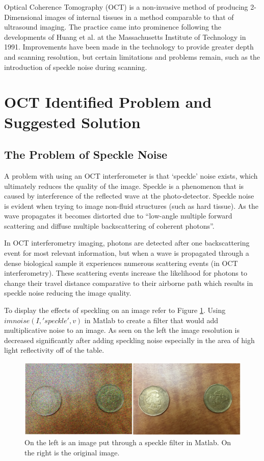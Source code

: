 \documentclass[%
reprint,
showpacs,preprintnumbers,
bibnotes,
amsmath,amssymb,
aps,
pra,
]{revtex4-1}
\begin{document}
		Optical Coherence Tomography (OCT) is a non-invasive method of producing 2-Dimensional images of internal tissues in a method comparable to that of ultrasound imaging.\cite{Huang91}\cite{sander_optical_2011} The practice came into prominence following the developments of Huang et al. at the Massachusetts Institute of Technology in 1991. \cite{Huang91} Improvements have been made in the technology to provide greater depth and scanning resolution, but certain limitations and problems remain, such as the introduction of speckle noise during scanning.




	\section{\label{sec:level1}OCT Identified Problem and Suggested Solution}
	\subsection{\label{sec:level2} The Problem of Speckle Noise}
	
		A problem with using an OCT interferometer is that ‘speckle’ noise exists, which ultimately reduces the quality of the image. Speckle is a phenomenon that is caused by interference of the reflected wave at the photo-detector. Speckle noise is evident when trying to image non-fluid structures (such as hard tissue). As the wave propagates it becomes distorted due to “low-angle multiple forward scattering and diffuse multiple backscattering of coherent photons”. \cite{Popescu2007}

		In OCT interferometry imaging, photons are detected after one backscattering event for most relevant information, but when a wave is propagated through a dense biological sample it experiences numerous scattering events (in OCT interferometry). These scattering events increase the likelihood for photons to change their travel distance comparative to their airborne path which results in speckle noise reducing the image quality. \cite{Popescu2007}

		To display the effects of speckling on an image refer to Figure \ref{fig:specklefilter2}. Using $imnoise(I,'speckle',v)$ in Matlab to create a filter that would add multiplicative noise to an image. As seen on the left the image resolution is decreased significantly after adding speckling noise especially in the area of high light reflectivity off of the table.
		
		\begin{figure}[htb!]
			\centering
			\includegraphics[width=0.8\linewidth]{Figures/specklefilter2}
			\caption{On the left is an image put through a speckle filter in Matlab. On the right is the original image.}
			\label{fig:specklefilter2}
		\end{figure}
\end{document}
